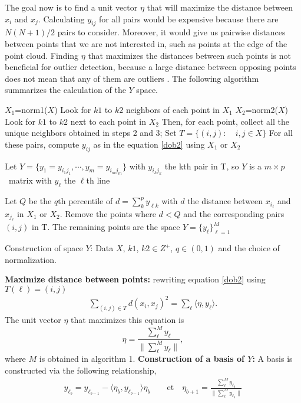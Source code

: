  The goal now is to find a unit vector $\eta$ that will maximize the distance between $x_i$ and $x_j$. Calculating $y_{ij}$ for all pairs would be expensive because there are $N (N + 1) / 2$ pairs to consider. Moreover, it would give us pairwise distances between points that we are not interested in, such as points at the edge of the point cloud. Finding $\eta$ that maximizes the distances between such points is not beneficial for outlier detection, because a large distance between opposing points does not mean that any of them are outliers \cite{A7}. The following algorithm summarizes the calculation of the $Y$ space.
\begin{algorithm}
\SetAlgoLined
$X_1$=norm1($X$)\;
Look for $k1$ to $k2$ neighbors of each point in $X_1$\;
$X_2$=norm2($X$)\;
Look for $k1$ to $k2$ next to each point in $X_2$\;
Then, for each point, collect all the unique neighbors obtained in steps 2 and 3;
Set $T=\{(i,j): \quad i,j\in X\}$\;
For all these pairs, compute $y_{ij}$ as in the equation \eqref{dob2} using $X_1$ or $X_2$\;

Let $Y=\{y_1=y_{i_1j_1},\cdots,y_m=y_{i_mj_m}\}$
with $y_{i_kj_k}$ the kth pair in T, so $Y$ is a $m \times p$\ matrix with $y_\ell$ the $\ell$th line\;

Let $Q$ be the $q$th percentile of $d=\sum_k^p y_{\ell k}$ with $d$ the distance between $x_{i_\ell}$ and $
x_{j_\ell}$ in $X_1$ or $X_2$.\;
Remove the points where $d<Q$ and the corresponding pairs $(i,j)$ in T.\;
The remaining points are the space $Y=\{y_\ell \}^M_{\ell=1}$\;
\caption{Construction of space $Y$: Data $X$, $k1$, $k2 \in Z^+$, $q\in (0, 1)$ and the choice of normalization.}
\end{algorithm}\newl
\textbf{Maximize distance between points:}
rewriting equation \eqref{dob2} using $T(\ell)=(i,j)$
\begin{align}\label{dob3}
\sum_{(i,j)\in T}d(x_i,x_j)^2=\sum_\ell \langle\eta,y_\ell\rangle.
\end{align}
The  unit vector $\eta$ that maximizes this equation is $$\displaystyle \eta=\frac{\sum_\ell^M y_\ell}{\|\sum_\ell^M y_\ell\|},$$ where $M$ is obtained in algorithm 1.\newl
\textbf{Construction of a basis of $Y$: }
A basis is constructed via the following relationship,
\begin{align*}
y_{\ell_b}=y_{\ell_{b-1}}- \langle\eta_b,y_{\ell_{b-1}}\rangle \eta_b\qquad\text{et}\quad
\eta_{b+1}=\frac{\sum_\ell^M y_{\ell_b}}{\|\sum_\ell^M y_{\ell_b}\|}
\end{align*}
